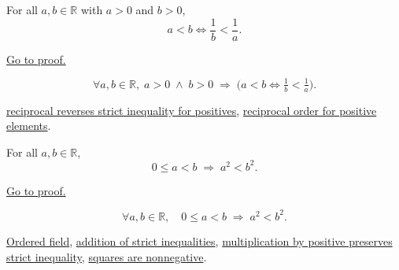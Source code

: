 
\begin{theorem}
\label{thm:ineq-reciprocal-flip}
For all $a, b \in \mathbb{R}$ with $a > 0$ and $b > 0$,
\[
  a < b \iff \frac{1}{b} < \frac{1}{a}.
\]
\end{theorem}



\begin{remark*}[Proof]
\hyperref[prf:ineq-reciprocal-flip]{Go to proof.}
\end{remark*}

\begin{remark*}
\[
  \forall a, b \in \mathbb{R},\;
  a > 0 \;\land\; b > 0 \;\Rightarrow\;
  \bigl(a < b \iff \tfrac{1}{b} < \tfrac{1}{a}\bigr).
\]
\end{remark*}

\begin{dependencies}
\hyperref[thm:ineq-reciprocal-positive]{reciprocal reverses strict inequality for positives},
\hyperref[thm:reciprocal-reverses-order-on-positives-q]{reciprocal order for positive elements}.
\end{dependencies}


\begin{theorem}
\label{thm:ineq-square-monotone}
For all $a, b \in \mathbb{R}$,
\[
  0 \le a < b \;\Rightarrow\; a^2 < b^2.
\]
\end{theorem}



\begin{remark*}[Proof]
\hyperref[prf:ineq-square-monotone]{Go to proof.}
\end{remark*}

\begin{remark*}
\[
  \forall a, b \in \mathbb{R},\quad
  0 \le a < b \;\Rightarrow\; a^2 < b^2.
\]
\end{remark*}

\begin{dependencies}
\hyperref[def:real-ordered-field]{Ordered field},
\hyperref[thm:ineq-add-inequalities]{addition of strict inequalities},
\hyperref[thm:ineq-multiply-positive]{multiplication by positive preserves strict inequality},
\hyperref[prop:product-of-positives-is-positive-q]{squares are nonnegative}.
\end{dependencies}


